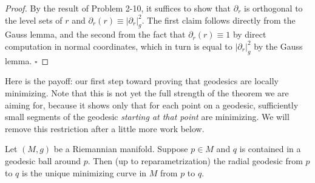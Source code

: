 \begin{proof}
By the result of Problem 2-10, it suffices to show that $\partial_r$ is orthogonal to the level sets of $r$ and $\partial_r(r) \equiv |\partial_r|_g^2$. The first claim follows directly from the Gauss lemma, and the second from the fact that $\partial_r(r) \equiv 1$ by direct computation in normal coordinates, which in turn is equal to $|\partial_r|_g^2$ by the Gauss lemma. $\square$
\end{proof}

Here is the payoff: our first step toward proving that geodesics are locally minimizing. Note that this is not yet the full strength of the theorem we are aiming for, because it shows only that for each point on a geodesic, sufficiently small segments of the geodesic \emph{starting at that point} are minimizing. We will remove this restriction after a little more work below.

\begin{proposition}
\label{prop:radial-geodesic-unique-minimizer}

Let $(M, g)$ be a Riemannian manifold. Suppose $p \in M$ and $q$ is contained in a geodesic ball around $p$. Then (up to reparametrization) the radial geodesic from $p$ to $q$ is the unique minimizing curve in $M$ from $p$ to $q$.
\end{proposition}

